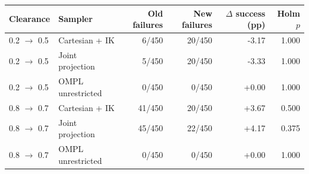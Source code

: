 \begin{tabular}{llrrrr}
\hline
Clearance & Sampler & Old failures & New failures & $\Delta$ success (pp) & Holm $p$ \\
\hline
0.2 $\to$ 0.5 & Cartesian + IK & 6/450 & 20/450 & -3.17 & 1.000 \\
0.2 $\to$ 0.5 & Joint projection & 5/450 & 20/450 & -3.33 & 1.000 \\
0.2 $\to$ 0.5 & OMPL unrestricted & 0/450 & 0/450 & +0.00 & 1.000 \\
0.8 $\to$ 0.7 & Cartesian + IK & 41/450 & 20/450 & +3.67 & 0.500 \\
0.8 $\to$ 0.7 & Joint projection & 45/450 & 22/450 & +4.17 & 0.375 \\
0.8 $\to$ 0.7 & OMPL unrestricted & 0/450 & 0/450 & +0.00 & 1.000 \\
\hline
\end{tabular}
